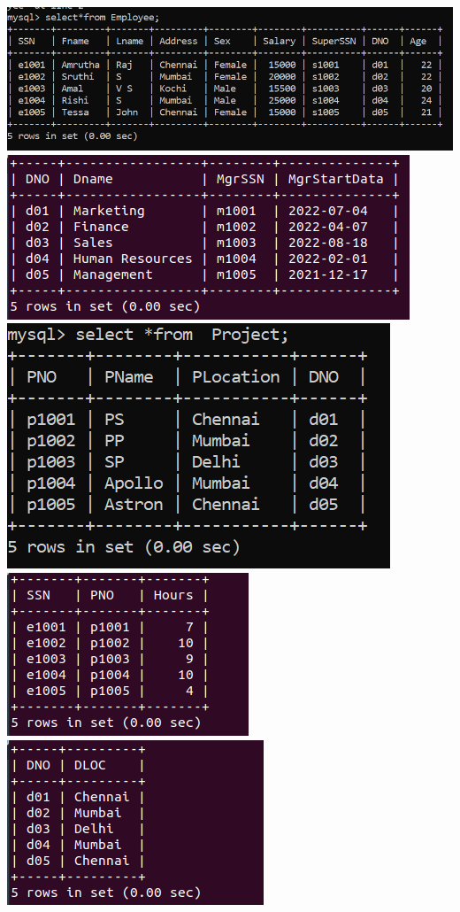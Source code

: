 \documentclass[a4paper,12pt]{report}
\begin{document}
\includegraphics[scale=0.6]{EMPLOYEEB.png}\newline\newline\includegraphics[scale=0.8]{DEPARTMENT2.png}\newline\newline
\includegraphics[scale=0.7]{Screenshot (459).png}\newline\newline
\includegraphics[scale=0.8]{WORKS_ON2.png}\newline\newline
\includegraphics[scale=0.8]{DLOCATION2.png}\\
\end{document}
